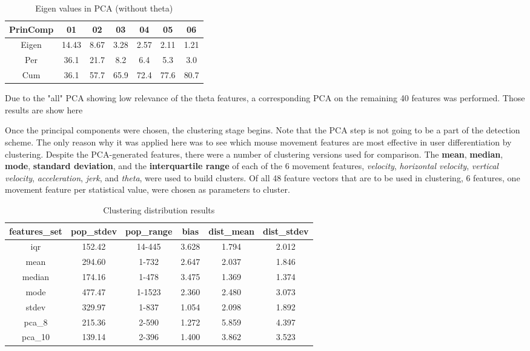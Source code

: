 \begin{table}[h!]
	\centering
	\begin{tabular}{|c|c|c|c|c|c|c|}
		\hline
		\textbf{PrinComp} & \textbf{01} & \textbf{02} & \textbf{03} & \textbf{04} & \textbf{05} & \textbf{06} \\
		\hline
		Eigen & 14.43 & 8.67 & 3.28 & 2.57 & 2.11 & 1.21 \\
		Per & 36.1 & 21.7 & 8.2 & 6.4 & 5.3 & 3.0 \\
		Cum & 36.1 & 57.7 & 65.9 & 72.4 & 77.6 & 80.7 \\
		\hline
	\end{tabular}
	\caption{Eigen values in PCA (without theta)}
	{\small Due to the "all" PCA showing low relevance of the theta features, a corresponding PCA on the remaining 40 features was performed. Those results are show here}
	\label{tab:eigen-values-without-theta}
\end{table}
\fi

Once the principal components were chosen, the clustering stage begins. Note that the PCA step is not going to be a part of the detection scheme. The only reason why it was applied here was to see which mouse movement features are most effective in user differentiation by clustering. Despite the PCA-generated features, there were a number of clustering versions used for comparison. The \textbf{mean}, \textbf{median}, \textbf{mode}, \textbf{standard deviation}, and the \textbf{interquartile range} of each of the 6 movement features, \textit{velocity}, \textit{horizontal velocity}, \textit{vertical velocity}, \textit{acceleration}, \textit{jerk}, and \textit{theta}, were used to build clusters. Of all 48 feature vectors that are to be used in clustering, 6 features, one movement feature per statistical value, were chosen as parameters to cluster.

\begin{table}[h!]
	\centering
	\begin{tabular}{ |c|c|c|c|c|c| }
		\hline
		\textbf{features{\_}set} & \textbf{pop{\_}stdev} & \textbf{pop{\_}range} & \textbf{bias} & \textbf{dist{\_}mean} & \textbf{dist{\_}stdev} \\
		\hline
		iqr & 152.42 & 14-445 & 3.628 & 1.794 & 2.012 \\
		mean & 294.60 & 1-732 & 2.647 & 2.037 & 1.846 \\
		median & 174.16 & 1-478 & 3.475 & 1.369 & 1.374 \\
		mode & 477.47 & 1-1523 & 2.360 & 2.480 & 3.073 \\
		stdev & 329.97 & 1-837 & 1.054 & 2.098 & 1.892 \\
		pca{\_}8 & 215.36 & 2-590 & 1.272 & 5.859 & 4.397 \\
		pca{\_}10 & 139.14 & 2-396 & 1.400 & 3.862 & 3.523 \\
		\hline
	\end{tabular}
	\caption{Clustering distribution results}
	\label{tab:clustering-distribution-results}
\end{table}

